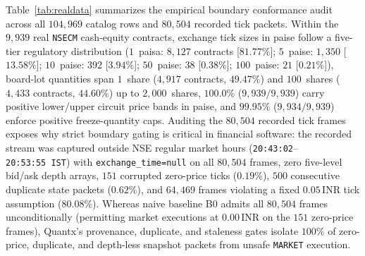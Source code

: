 \documentclass[12pt]{article}
\newcommand{\thinunit}[2]{#1\,\text{#2}}
\begin{document}
Table~\ref{tab:realdata} summarizes the empirical boundary conformance audit across all $104{,}969$ catalog rows and $80{,}504$ recorded tick packets. Within the $9{,}939$ real \texttt{NSECM} cash-equity contracts, exchange tick sizes in paise follow a five-tier regulatory distribution ($1$~paisa: $8{,}127$ contracts [$81.77\%$]; $5$~paise: $1{,}350$ [$13.58\%$]; $10$~paise: $392$ [$3.94\%$]; $50$~paise: $38$ [$0.38\%$]; $100$~paise: $21$ [$0.21\%$]), board-lot quantities span $1$~share ($4{,}917$ contracts, $49.47\%$) and $100$~shares ($4{,}433$ contracts, $44.60\%$) up to $2{,}000$~shares, $100.0\%$ ($9{,}939/9{,}939$) carry positive lower/upper circuit price bands in paise, and $99.95\%$ ($9{,}934/9{,}939$) enforce positive freeze-quantity caps. Auditing the $80{,}504$ recorded tick frames exposes why strict boundary gating is critical in financial software: the recorded stream was captured outside NSE regular market hours (\texttt{20:43:02}--\texttt{20:53:55~IST}) with \texttt{exchange\_time=null} on all $80{,}504$ frames, zero five-level bid/ask depth arrays, $151$ corrupted zero-price ticks ($0.19\%$), $500$ consecutive duplicate state packets ($0.62\%$), and $64{,}469$ frames violating a fixed $\thinunit{0.05}{INR}$ tick assumption ($80.08\%$). Whereas naive baseline B0 admits all $80{,}504$ frames unconditionally (permitting market executions at $\thinunit{0.00}{INR}$ on the $151$ zero-price frames), Quantx's provenance, duplicate, and staleness gates isolate $100\%$ of zero-price, duplicate, and depth-less snapshot packets from unsafe \texttt{MARKET} execution.
\end{document}
